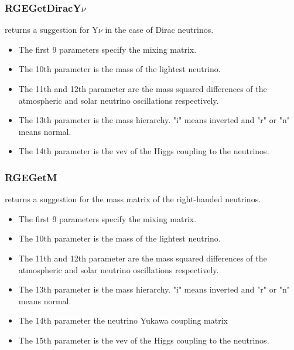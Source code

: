 \documentclass[10pt,a4paper,twoside]{scrartcl}
\begin{document}
\subsubsection{RGEGetDiracY$\nu$}

 returns a suggestion for Y$\nu$
    in the case of Dirac neutrinos.
\begin{itemize}
\item The first 9 parameters specify the mixing matrix.
\item The 10th parameter is the mass of the lightest neutrino.
\item The 11th and 12th parameter are the mass squared differences of the
atmospheric and solar neutrino oscillations respectively.
\item The 13th parameter is the mass hierarchy. "i" means inverted and "r" or
"n" means normal.
\item The 14th parameter is the vev of the Higgs coupling
to the neutrinos.
\end{itemize}


\subsubsection{RGEGetM}

 returns a
    suggestion for the mass matrix of the right-handed neutrinos.
\begin{itemize}
\item The first 9 parameters specify the mixing matrix.
\item The 10th parameter is the mass of the lightest neutrino.
\item The 11th and 12th parameter are the mass squared differences of the
atmospheric and solar neutrino oscillations respectively.
\item The 13th parameter is the mass hierarchy. "i" means inverted and "r" or
"n" means normal.
\item The 14th parameter the neutrino Yukawa coupling matrix
\item The 15th parameter is the vev of the Higgs coupling
to the neutrinos.
\end{itemize}
\end{document}
